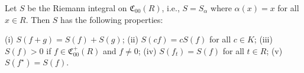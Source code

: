 Let $S$ be the Riemann integral on $\mathfrak{C}_{00}(R)$, i.e., $S = S_{\alpha}$ where $\alpha(x) = x$ for all $x \in R$. Then $S$ has the following properties:

(i) $S(f + g) = S(f) + S(g)$;
(ii) $S(cf) = cS(f)$ for all $c \in K$;
(iii) $S(f) > 0$ if $f \in \mathfrak{C}_{00}^{+}(R)$ and $f \neq 0$;
(iv) $S(f_t) = S(f)$ for all $t \in R$;
(v) $S(f^{\star}) = S(f)$.